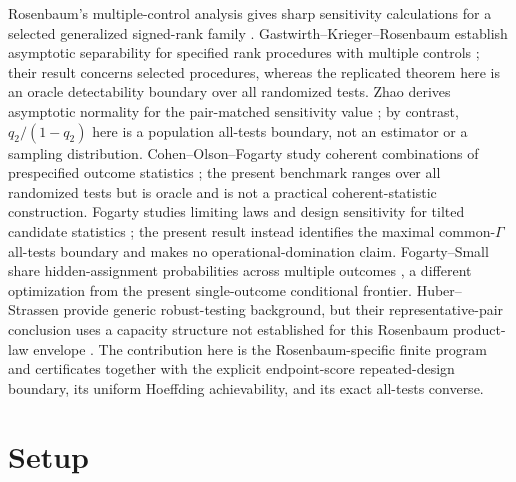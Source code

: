 \documentclass{article}
\begin{document}
Rosenbaum's multiple-control analysis gives sharp sensitivity calculations for a selected generalized signed-rank family \cite{Rosenbaum1988SensitivityMultipleControls}. Gastwirth--Krieger--Rosenbaum establish asymptotic separability for specified rank procedures with multiple controls \cite{GastwirthKriegerRosenbaum2000Separability}; their result concerns selected procedures, whereas the replicated theorem here is an oracle detectability boundary over all randomized tests. Zhao derives asymptotic normality for the pair-matched sensitivity value \cite{Zhao2019SensitivityValue}; by contrast, \(q_2/(1-q_2)\) here is a population all-tests boundary, not an estimator or a sampling distribution. Cohen--Olson--Fogarty study coherent combinations of prespecified outcome statistics \cite{CohenOlsonFogarty2020AdversarialGame}; the present benchmark ranges over all randomized tests but is oracle and is not a practical coherent-statistic construction. Fogarty studies limiting laws and design sensitivity for tilted candidate statistics \cite{Fogarty2025Tilted}; the present result instead identifies the maximal common-\(\Gamma\) all-tests boundary and makes no operational-domination claim. Fogarty--Small share hidden-assignment probabilities across multiple outcomes \cite{FogartySmall2016MultipleComparisons}, a different optimization from the present single-outcome conditional frontier. Huber--Strassen provide generic robust-testing background, but their representative-pair conclusion uses a capacity structure not established for this Rosenbaum product-law envelope \cite{HuberStrassen1973Minimax}. The contribution here is the Rosenbaum-specific finite program and certificates together with the explicit endpoint-score repeated-design boundary, its uniform Hoeffding achievability, and its exact all-tests converse.

\section{Setup}
\end{document}
